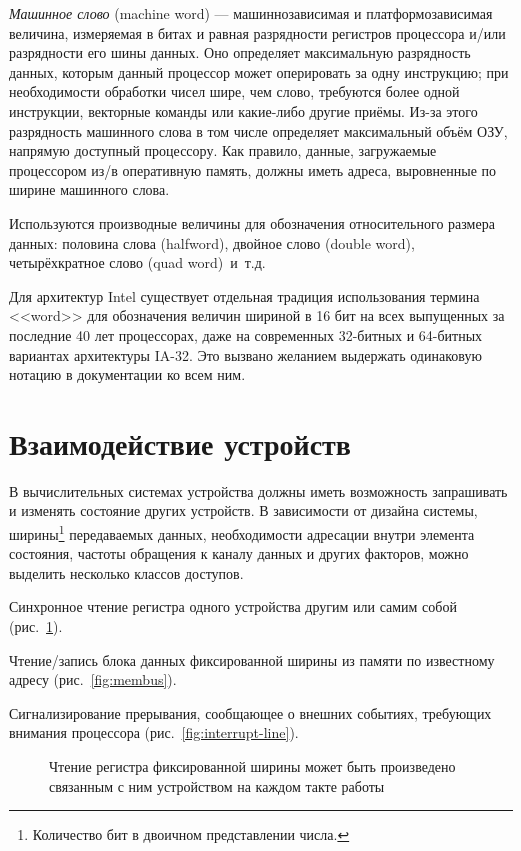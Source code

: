 \textit{Машинное слово} (\abbr machine word) --- машиннозависимая и платформозависимая величина, измеряемая в битах и равная разрядности регистров процессора и/или разрядности его шины данных. Оно определяет максимальную разрядность данных, которым данный процессор может оперировать за одну инструкцию; при необходимости обработки чисел шире, чем слово, требуются более одной инструкции, векторные команды или какие-либо другие приёмы. Из-за этого разрядность машинного слова в том числе определяет максимальный объём ОЗУ, напрямую доступный процессору. Как правило, данные, загружаемые процессором из/в оперативную память, должны иметь адреса, выровненные по ширине машинного слова.

Используются производные величины для обозначения относительного размера данных: половина слова (\abbr halfword), двойное слово (\abbr double word), четырёхкратное слово (\abbr quad word)~и~т.д.

Для архитектур Intel существует отдельная традиция использования термина <<word>> для обозначения величин шириной в 16 бит на всех выпущенных за последние 40 лет процессорах, даже на современных 32-битных и 64-битных вариантах архитектуры IA-32. Это вызвано желанием выдержать одинаковую нотацию в документации ко всем ним.

\section{Взаимодействие устройств}

В вычислительных системах устройства должны иметь возможность запрашивать и изменять состояние других устройств. В зависимости от дизайна системы, ширины\footnote{Количество бит в двоичном представлении числа.} передаваемых данных, необходимости адресации внутри элемента состояния, частоты обращения к каналу данных и других факторов, можно выделить несколько классов доступов.

\begin{itemize*}
\item Синхронное чтение регистра одного устройства другим или самим собой (рис.~\ref{fig:register}).
\item Чтение/запись блока данных фиксированной ширины из памяти по известному адресу (рис.~\ref{fig:membus}). 
\item Сигнализирование прерывания, сообщающее о внешних событиях, требующих внимания процессора (рис.~\ref{fig:interrupt-line}).
\end{itemize*}

\begin{figure}[htb]
    \centering
    \caption[Чтение регистра]{Чтение регистра фиксированной ширины может быть произведено связанным с ним устройством на каждом такте работы}
    \label{fig:register}
\end{figure}

